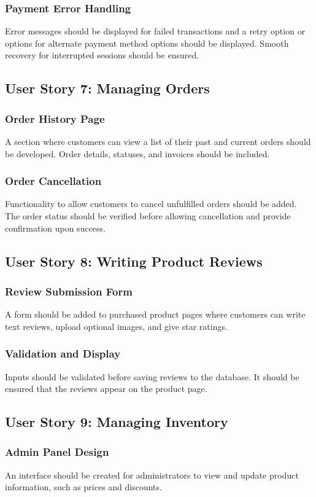 \documentclass[twoside,a4paper,journal]{IEEEtran}
\begin{document}
\subsubsection{Payment Error Handling}
Error messages should be displayed for failed transactions and a retry option or
options for alternate payment method options should be displayed.
Smooth recovery for interrupted sessions should be ensured.

\subsection{User Story 7: Managing Orders}
\subsubsection{Order History Page}
A section where customers can view a list of their past and current
orders should be developed.
Order details, statuses, and invoices should be included.
\subsubsection{Order Cancellation}
Functionality to allow customers to cancel unfulfilled orders should be added.
The order status should be verified before allowing cancellation and provide
confirmation upon success.

\subsection{User Story 8: Writing Product Reviews}
\subsubsection{Review Submission Form}
A form should be added to purchased product pages where customers can write text
reviews, upload optional images, and give star ratings.
\subsubsection{Validation and Display}
Inputs should be validated before saving reviews to the database.
It should be ensured that the reviews appear on the product page.

\subsection{User Story 9: Managing Inventory}
\subsubsection{Admin Panel Design}
An interface should be created for administrators to view and update product
information, such as prices and discounts.
\end{document}
